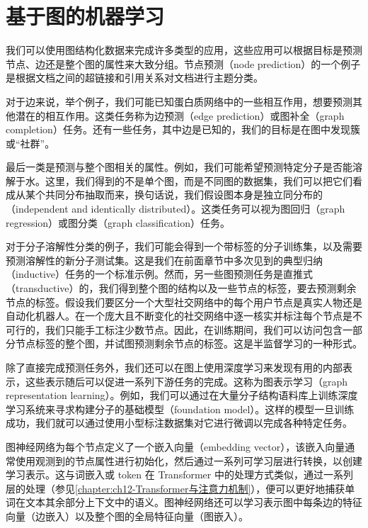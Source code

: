 \documentclass[../../main.tex]{subfiles}
\begin{document}
\section{基于图的机器学习}\label{section:ch13-基于图的机器学习}

我们可以使用图结构化数据来完成许多类型的应用，这些应用可以根据目标是预测节点、边还是整个图的属性来大致分组。节点预测（node prediction）的一个例子是根据文档之间的超链接和引用关系对文档进行主题分类。

对于边来说，举个例子，我们可能已知蛋白质网络中的一些相互作用，想要预测其他潜在的相互作用。这类任务称为边预测（edge prediction）或图补全（graph completion）任务。还有一些任务，其中边是已知的，我们的目标是在图中发现簇或“社群”。

最后一类是预测与整个图相关的属性。例如，我们可能希望预测特定分子是否能溶解于水。这里，我们得到的不是单个图，而是不同图的数据集，我们可以把它们看成从某个共同分布抽取而来，换句话说，我们假设图本身是独立同分布的（independent and identically distributed）。这类任务可以视为图回归（graph regression）或图分类（graph classification）任务。

对于分子溶解性分类的例子，我们可能会得到一个带标签的分子训练集，以及需要预测溶解性的新分子测试集。这是我们在前面章节中多次见到的典型归纳（inductive）任务的一个标准示例。然而，另一些图预测任务是直推式（transductive）的，我们得到整个图的结构以及一些节点的标签，要去预测剩余节点的标签。假设我们要区分一个大型社交网络中的每个用户节点是真实人物还是自动化机器人。在一个庞大且不断变化的社交网络中逐一核实并标注每个节点是不可行的，我们只能手工标注少数节点。因此，在训练期间，我们可以访问包含一部分节点标签的整个图，并试图预测剩余节点的标签。这是半监督学习的一种形式。

除了直接完成预测任务外，我们还可以在图上使用深度学习来发现有用的内部表示，这些表示随后可以促进一系列下游任务的完成。这称为图表示学习（graph representation learning）。例如，我们可以通过在大量分子结构语料库上训练深度学习系统来寻求构建分子的基础模型（foundation model）。这样的模型一旦训练成功，我们就可以通过使用小型标注数据集对它进行微调以完成各种特定任务。

图神经网络为每个节点定义了一个嵌入向量（embedding vector），该嵌入向量通常使用观测到的节点属性进行初始化，然后通过一系列可学习层进行转换，以创建学习表示。这与词嵌入或 token 在 Transformer 中的处理方式类似，通过一系列层的处理（参见\cref{chapter:ch12-Transformer与注意力机制}），便可以更好地捕获单词在文本其余部分上下文中的语义。图神经网络还可以学习表示图中每条边的特征向量（边嵌入）以及整个图的全局特征向量（图嵌入）。
\end{document}
